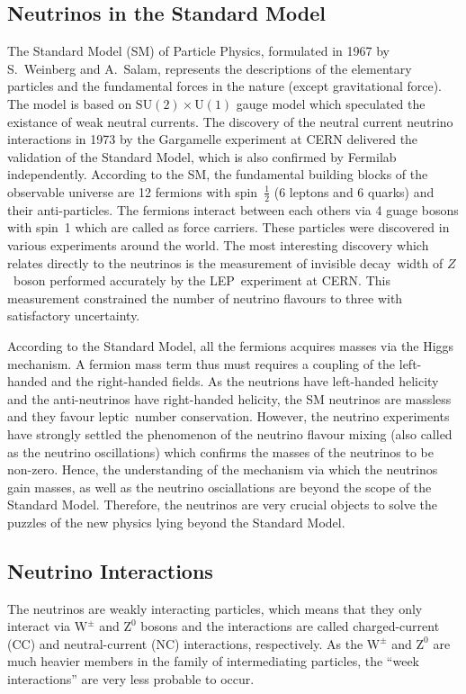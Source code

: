 \subsection{Neutrinos in the Standard Model}
The Standard Model (SM) of Particle Physics, formulated in 1967 by S.~Weinberg and A.~Salam, represents the descriptions of the elementary particles and the fundamental forces in the nature (except gravitational force)\cite{weinberg1967,abdus1968}.
The model is based on $\text{SU}\left(2\right)\times\text{U}\left(1\right)$ gauge model which speculated the existance of weak neutral currents\cite{glashow1961}.
The discovery of the neutral current neutrino interactions in 1973 by the Gargamelle experiment at CERN delivered the validation of the Standard Model\cite{hasert1973,hasert1973_1,hasert1974}, which is also confirmed by Fermilab independently\cite{benvenuti1974}.
According to the SM, the fundamental building blocks of the observable universe are 12 fermions with spin~$\frac{1}{2}$ (6 leptons and 6 quarks) and their anti-particles.
The fermions interact between each others via 4 guage bosons with spin~1 which are called as force carriers. These particles were discovered in various experiments around the world.
The most interesting discovery which relates directly to the neutrinos is the measurement of invisible decay~width of $Z$~boson performed accurately by the LEP~experiment at CERN\cite{numberneut}. This measurement constrained the number of neutrino flavours to three with satisfactory uncertainty.

According to the Standard Model, all the fermions acquires masses via the Higgs mechanism.
A fermion mass term thus must requires a coupling of the left-handed and the right-handed fields.
As the neutrions have left-handed helicity and the anti-neutrinos have right-handed helicity, the SM neutrinos are massless and they favour leptic~number conservation.
However, the neutrino experiments have strongly settled the phenomenon of the neutrino flavour mixing (also called as the neutrino oscillations) which confirms the masses of the neutrinos to be non-zero.
Hence, the understanding of the mechanism via which the neutrinos gain masses, as well as the neutrino osciallations are beyond the scope of the Standard Model.
Therefore, the neutrinos are very crucial objects to solve the puzzles of the new physics lying beyond the Standard Model.


\subsection{Neutrino Interactions}
The neutrinos are weakly interacting particles, which means that they only interact via $\mathrm{W}^{\pm}$ and $\mathrm{Z}^{0}$ bosons and the interactions are called charged-current (CC) and neutral-current (NC) interactions, respectively. As the $\mathrm{W}^{\pm}$ and $\mathrm{Z}^{0}$ are much heavier members in the family of intermediating particles, the ``week interactions'' are very less probable to occur.

